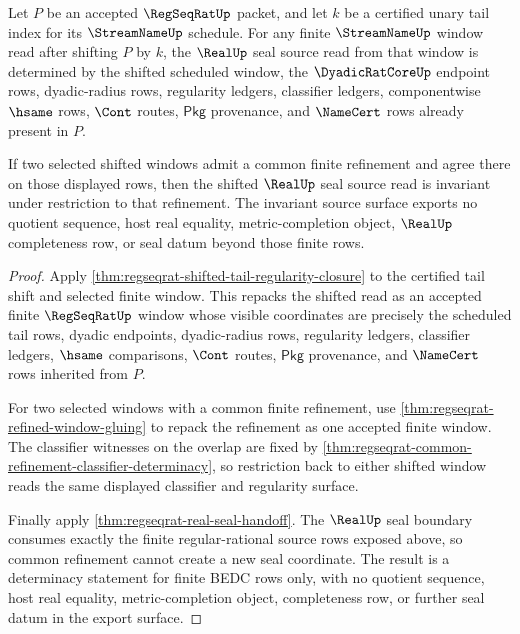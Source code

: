 \begin{theorem}
\label{thm:regseqrat-shifted-tail-seal-determinacy}
Let $P$ be an accepted $\RegSeqRatUp$ packet, and let $k$ be a certified unary tail index for its $\StreamNameUp$ schedule. For any finite $\StreamNameUp$ window read after shifting $P$ by $k$, the $\RealUp$ seal source read from that window is determined by the shifted scheduled window, the $\DyadicRatCoreUp$ endpoint rows, dyadic-radius rows, regularity ledgers, classifier ledgers, componentwise $\hsame$ rows, $\Cont$ routes, $\mathsf{Pkg}$ provenance, and $\NameCert$ rows already present in $P$.

If two selected shifted windows admit a common finite refinement and agree there on those displayed rows, then the shifted $\RealUp$ seal source read is invariant under restriction to that refinement. The invariant source surface exports no quotient sequence, host real equality, metric-completion object, $\RealUp$ completeness row, or seal datum beyond those finite rows.
\end{theorem}
\begin{proof}
Apply \autoref{thm:regseqrat-shifted-tail-regularity-closure} to the certified tail shift and selected finite window. This repacks the shifted read as an accepted finite $\RegSeqRatUp$ window whose visible coordinates are precisely the scheduled tail rows, dyadic endpoints, dyadic-radius rows, regularity ledgers, classifier ledgers, $\hsame$ comparisons, $\Cont$ routes, $\mathsf{Pkg}$ provenance, and $\NameCert$ rows inherited from $P$.

For two selected windows with a common finite refinement, use \autoref{thm:regseqrat-refined-window-gluing} to repack the refinement as one accepted finite window. The classifier witnesses on the overlap are fixed by \autoref{thm:regseqrat-common-refinement-classifier-determinacy}, so restriction back to either shifted window reads the same displayed classifier and regularity surface.

Finally apply \autoref{thm:regseqrat-real-seal-handoff}. The $\RealUp$ seal boundary consumes exactly the finite regular-rational source rows exposed above, so common refinement cannot create a new seal coordinate. The result is a determinacy statement for finite BEDC rows only, with no quotient sequence, host real equality, metric-completion object, completeness row, or further seal datum in the export surface.
\end{proof}


